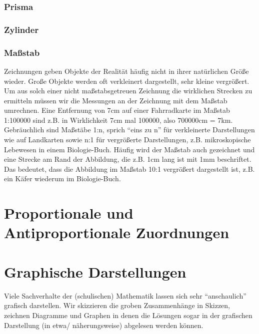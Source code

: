 \documentclass[a4paper]{book}%
\theoremstyle{definition}
\begin{document}
\subsection{Prisma}\label{Prisma}

\subsection{Zylinder}\label{Zylinder}

\subsection{Maßstab}\label{Maßstab}

Zeichnungen geben Objekte der Realität häufig nicht in ihrer natürlichen Größe wieder. Große Objekte werden oft verkleinert dargestellt, sehr kleine vergrößert. Um aus solch einer nicht maßstabsgetreuen Zeichnung die wirklichen Strecken zu ermitteln müssen wir die Messungen an der Zeichnung mit dem Maßstab umrechnen. Eine Entfernung von 7cm auf einer Fahrradkarte im Maßstab 1:100000 sind z.B. in Wirklichkeit 7cm mal 100000, also 700000cm = 7km. Gebräuchlich sind Maßstäbe 1:n, sprich \enquote{eins zu n} für verkleinerte Darstellungen wie auf Landkarten sowie n:1 für vergrößerte Darstellungen, z.B. mikroskopische Lebewesen in einem Biologie-Buch. Häufig wird der Maßstab auch gezeichnet und eine Strecke am Rand der Abbildung, die z.B. 1cm lang ist mit 1mm beschriftet. Das bedeutet, dass die Abbildung im Maßstab 10:1 vergrößert dargestellt ist, z.B. ein Käfer wiederum im Biologie-Buch.


\chapter{Proportionale und Antiproportionale Zuordnungen}


\chapter{Graphische Darstellungen}

Viele Sachverhalte der (schulischen) Mathematik lassen sich sehr \enquote{anschaulich} grafisch darstellen. Wir skizzieren die groben Zusammenhänge in Skizzen, zeichnen Diagramme und Graphen in denen die Lösungen sogar in der grafischen Darstellung (in etwa/ näherungsweise) abgelesen werden können.
\end{document}
